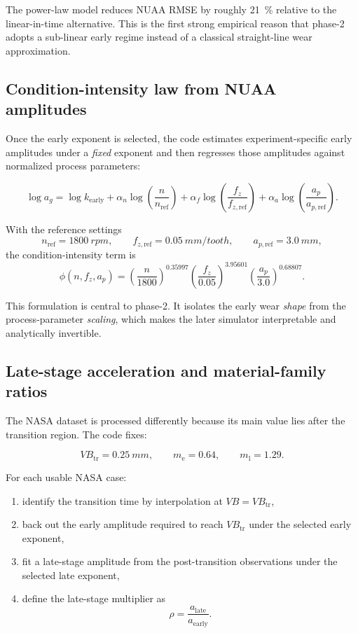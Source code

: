 \documentclass[11pt,a4paper]{article}
\newcommand{\vb}{V\!B}
\newcommand{\vbtr}{V\!B_{\mathrm{tr}}}
\newcommand{\phii}{\phi}
\newcommand{\earlyexp}{m_{\mathrm{e}}}
\newcommand{\lateexp}{m_{\mathrm{l}}}
\begin{document}
The power-law model reduces NUAA RMSE by roughly \SI{21}{\percent} relative to the linear-in-time alternative.
This is the first strong empirical reason that phase-2 adopts a sub-linear early regime instead of a classical straight-line
wear approximation.

\subsection{Condition-intensity law from NUAA amplitudes}

Once the early exponent is selected, the code estimates experiment-specific early amplitudes under a \emph{fixed}
exponent and then regresses those amplitudes against normalized process parameters:

\begin{equation}
\log a_g =
\log k_{\mathrm{early}}
 + \alpha_n \log \left(\frac{n}{n_{\mathrm{ref}}}\right)
 + \alpha_f \log \left(\frac{f_z}{f_{z,\mathrm{ref}}}\right)
 + \alpha_a \log \left(\frac{a_p}{a_{p,\mathrm{ref}}}\right).
\label{eq:log-amplitude}
\end{equation}

With the reference settings
\[
n_{\mathrm{ref}} = \SI{1800}{rpm}, \qquad
f_{z,\mathrm{ref}} = \SI{0.05}{mm/tooth}, \qquad
a_{p,\mathrm{ref}} = \SI{3.0}{mm},
\]
the condition-intensity term is
\begin{equation}
\phii(n,f_z,a_p) =
\left(\frac{n}{1800}\right)^{0.35997}
\left(\frac{f_z}{0.05}\right)^{3.95601}
\left(\frac{a_p}{3.0}\right)^{0.68807}.
\label{eq:phi}
\end{equation}

This formulation is central to phase-2. It isolates the early wear \emph{shape} from the process-parameter
\emph{scaling}, which makes the later simulator interpretable and analytically invertible.

\subsection{Late-stage acceleration and material-family ratios}

The NASA dataset is processed differently because its main value lies after the transition region. The code fixes:

\[
\vbtr = \SI{0.25}{mm}, \qquad \earlyexp = 0.64, \qquad \lateexp = 1.29.
\]

For each usable NASA case:

\begin{enumerate}[leftmargin=1.8em]
\item identify the transition time by interpolation at \(\vb = \vbtr\),
\item back out the early amplitude required to reach \(\vbtr\) under the selected early exponent,
\item fit a late-stage amplitude from the post-transition observations under the selected late exponent,
\item define the late-stage multiplier as
\[
\rho = \frac{a_{\mathrm{late}}}{a_{\mathrm{early}}}.
\]
\end{enumerate}
\end{document}
